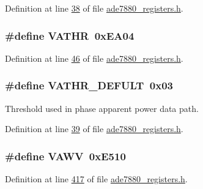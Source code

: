 Definition at line \hyperlink{a00036_source_l00038}{38} of file \hyperlink{a00036_source}{ade7880\-\_\-registers.\-h}.

\hypertarget{a00036_af97b8b6a3a2c63818edbc7f6cdceae23}{
\subsubsection[{V\-A\-T\-H\-R}]{\setlength{\rightskip}{0pt plus 5cm}\#define V\-A\-T\-H\-R~0x\-E\-A04}}\label{de/d8c/a00036_af97b8b6a3a2c63818edbc7f6cdceae23}


Definition at line \hyperlink{a00036_source_l00046}{46} of file \hyperlink{a00036_source}{ade7880\-\_\-registers.\-h}.

\hypertarget{a00036_a3ca4a19859a50d3b85939e9b0c145637}{
\subsubsection[{V\-A\-T\-H\-R\-\_\-\-D\-E\-F\-U\-L\-T}]{\setlength{\rightskip}{0pt plus 5cm}\#define V\-A\-T\-H\-R\-\_\-\-D\-E\-F\-U\-L\-T~0x03}}\label{de/d8c/a00036_a3ca4a19859a50d3b85939e9b0c145637}


Threshold used in phase apparent power data path. 



Definition at line \hyperlink{a00036_source_l00039}{39} of file \hyperlink{a00036_source}{ade7880\-\_\-registers.\-h}.

\hypertarget{a00036_acfb04c2e25dcd5d27eac1dbe952b076c}{
\subsubsection[{V\-A\-W\-V}]{\setlength{\rightskip}{0pt plus 5cm}\#define V\-A\-W\-V~0x\-E510}}\label{de/d8c/a00036_acfb04c2e25dcd5d27eac1dbe952b076c}


Definition at line \hyperlink{a00036_source_l00417}{417} of file \hyperlink{a00036_source}{ade7880\-\_\-registers.\-h}.

